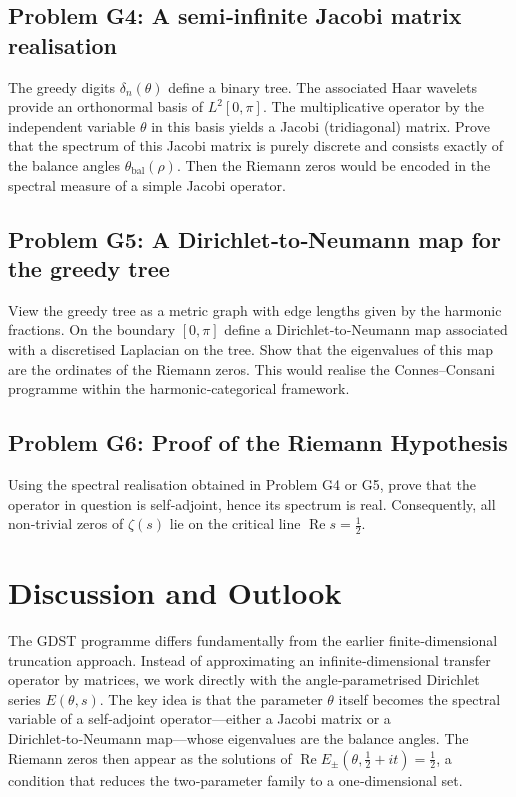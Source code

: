 \documentclass[11pt,a4paper]{article}
\theoremstyle{remark}
\begin{document}
\subsection{Problem G4: A semi‑infinite Jacobi matrix realisation}
The greedy digits \(\delta_n(\theta)\) define a binary tree.  The associated Haar wavelets provide an orthonormal basis of \(L^2[0,\pi]\).  The multiplicative operator by the independent variable \(\theta\) in this basis yields a Jacobi (tridiagonal) matrix.  Prove that the spectrum of this Jacobi matrix is purely discrete and consists exactly of the balance angles \(\theta_{\mathrm{bal}}(\rho)\).  Then the Riemann zeros would be encoded in the spectral measure of a simple Jacobi operator.

\subsection{Problem G5: A Dirichlet‑to‑Neumann map for the greedy tree}
View the greedy tree as a metric graph with edge lengths given by the harmonic fractions.  On the boundary \([0,\pi]\) define a Dirichlet‑to‑Neumann map associated with a discretised Laplacian on the tree.  Show that the eigenvalues of this map are the ordinates of the Riemann zeros.  This would realise the Connes–Consani programme within the harmonic‑categorical framework.

\subsection{Problem G6: Proof of the Riemann Hypothesis}
Using the spectral realisation obtained in Problem G4 or G5, prove that the operator in question is self‑adjoint, hence its spectrum is real.  Consequently, all non‑trivial zeros of \(\zeta(s)\) lie on the critical line \(\operatorname{Re}s=\frac12\).

\section{Discussion and Outlook}
The GDST programme differs fundamentally from the earlier finite‑dimensional truncation approach.  Instead of approximating an infinite‑dimensional transfer operator by matrices, we work directly with the angle‑parametrised Dirichlet series \(E(\theta,s)\).  The key idea is that the parameter \(\theta\) itself becomes the spectral variable of a self‑adjoint operator—either a Jacobi matrix or a Dirichlet‑to‑Neumann map—whose eigenvalues are the balance angles.  The Riemann zeros then appear as the solutions of \(\operatorname{Re}E_\pm(\theta,\frac12+it)=\frac12\), a condition that reduces the two‑parameter family to a one‑dimensional set.
\end{document}
